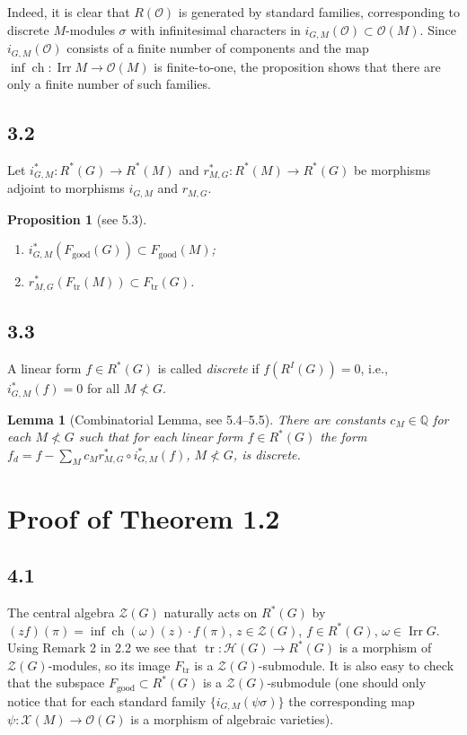 \documentclass[12pt,a4paper]{article}
\theoremstyle{plain}
\newtheorem{lemma}{Lemma}
\newtheorem{proposition}{Proposition}
\theoremstyle{definition}
\theoremstyle{remark}
\DeclareMathOperator{\Irr}{Irr}
\DeclareMathOperator{\tr}{tr}
\DeclareMathOperator{\ch}{ch}
\newcommand{\cH}{\mathscr{H}}
\newcommand{\cO}{\mathcal{O}}
\newcommand{\cZ}{\mathcal{Z}}
\newcommand{\cX}{\mathcal{X}}
\newcommand{\bQ}{\mathbb{Q}}
\begin{document}
Indeed, it is clear that $R(\cO)$ is generated by standard families, corresponding to discrete $M$-modules $\sigma$ with infinitesimal characters in $i_{G,M}(\cO) \subset \cO(M)$. Since $i_{G,M}(\cO)$ consists of a finite number of components and the map $\inf\ch: \Irr M \to \cO(M)$ is finite-to-one, the proposition shows that there are only a finite number of such families.

\subsection*{3.2}

Let $i_{G,M}^*: R^*(G) \to R^*(M)$ and $r_{M,G}^*: R^*(M) \to R^*(G)$ be morphisms adjoint to morphisms $i_{G,M}$ and $r_{M,G}$.

\begin{proposition}[see 5.3]
\begin{enumerate}[label=(\roman*)]
\item $i_{G,M}^*(F_{\text{good}}(G)) \subset F_{\text{good}}(M)$;
\item $r_{M,G}^*(F_{\tr}(M)) \subset F_{\tr}(G)$.
\end{enumerate}
\end{proposition}

\subsection*{3.3}

A linear form $f \in R^*(G)$ is called \emph{discrete} if $f(R^I(G)) = 0$, i.e., $i_{G,M}^*(f) = 0$ for all $M \not< G$.

\begin{lemma}[Combinatorial Lemma, see 5.4--5.5]
There are constants $c_M \in \bQ$ for each $M \not< G$ such that for each linear form $f \in R^*(G)$ the form $f_d = f - \sum_M c_M r_{M,G}^* \circ i_{G,M}^*(f)$, $M \not< G$, is discrete.
\end{lemma}

\section*{Proof of Theorem 1.2}

\subsection*{4.1}

The central algebra $\cZ(G)$ naturally acts on $R^*(G)$ by $(zf)(\pi) = \inf\ch(\omega)(z) \cdot f(\pi)$, $z \in \cZ(G)$, $f \in R^*(G)$, $\omega \in \Irr G$. Using Remark 2 in 2.2 we see that $\tr: \cH(G) \to R^*(G)$ is a morphism of $\cZ(G)$-modules, so its image $F_{\tr}$ is a $\cZ(G)$-submodule. It is also easy to check that the subspace $F_{\text{good}} \subset R^*(G)$ is a $\cZ(G)$-submodule (one should only notice that for each standard family $\{i_{G,M}(\psi\sigma)\}$ the corresponding map $\psi: \cX(M) \to \cO(G)$ is a morphism of algebraic varieties).
\end{document}
